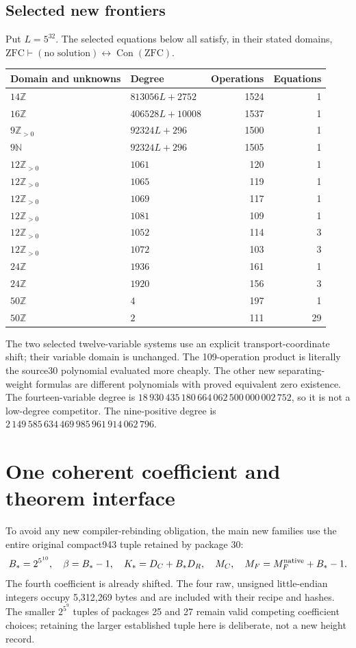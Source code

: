 \documentclass[11pt]{article}
\newcommand{\Z}{\mathbb Z}
\newcommand{\N}{\mathbb N}
\newcommand{\PP}{\mathbb Z_{>0}}
\newcommand{\Con}{\operatorname{Con}}
\begin{document}
\subsection*{Selected new frontiers}
Put $L=5^{32}$. The selected equations below all satisfy, in their stated domains,
$\mathrm{ZFC}\vdash (\text{no solution})\leftrightarrow\Con(\mathrm{ZFC})$.
\begin{center}\small
\begin{tabular}{llrr}
\toprule
Domain and unknowns & Degree & Operations & Equations\\\midrule
$14\Z$ & $813056L+2752$ & 1524 & 1\\
$16\Z$ & $406528L+10008$ & 1537 & 1\\
$9\PP$ & $92324L+296$ & 1500 & 1\\
$9\N$ & $92324L+296$ & 1505 & 1\\
$12\PP$ & $1061$ & 120 & 1\\
$12\PP$ & $1065$ & 119 & 1\\
$12\PP$ & $1069$ & 117 & 1\\
$12\PP$ & $1081$ & 109 & 1\\
$12\PP$ & $1052$ & 114 & 3\\
$12\PP$ & $1072$ & 103 & 3\\
$24\Z$ & $1936$ & 161 & 1\\
$24\Z$ & $1920$ & 156 & 3\\
$50\Z$ & $4$ & 197 & 1\\
$50\Z$ & $2$ & 111 & 29\\\bottomrule
\end{tabular}
\end{center}
The two selected twelve-variable systems use an explicit transport-coordinate shift; their variable domain is unchanged. The 109-operation product is literally the source30 polynomial evaluated more cheaply. The other new separating-weight formulas are different polynomials with proved equivalent zero existence. The fourteen-variable degree is
$18\,930\,435\,180\,664\,062\,500\,000\,002\,752$,
so it is not a low-degree competitor. The nine-positive degree is
$2\,149\,585\,634\,469\,985\,961\,914\,062\,796$.

\section{One coherent coefficient and theorem interface}
To avoid any new compiler-rebinding obligation, the main new families use the entire original compact943 tuple retained by package 30:
\[
 B_*=2^{5^{10}},\quad \beta=B_*-1,\quad
 K_*=D_C+B_*D_R,\quad M_C,\quad M_F=M_F^{\rm native}+B_*-1.
\]
The fourth coefficient is already shifted. The four raw, unsigned little-endian integers occupy 5,312,269 bytes and are included with their recipe and hashes. The smaller $2^{5^9}$ tuples of packages 25 and 27 remain valid competing coefficient choices; retaining the larger established tuple here is deliberate, not a new height record.
\end{document}
